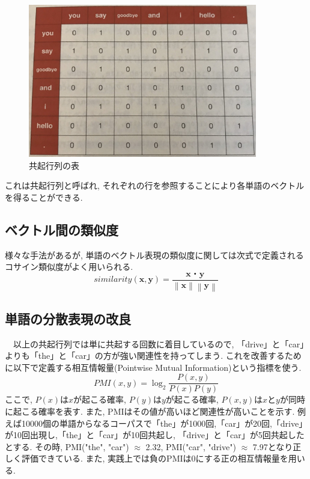 \documentclass[twocolumn]{jarticle}
\begin{document}
\begin{figure}[!htbp]
 \begin{center}
   \includegraphics[width=10cm]{./matrix.jpg}
   \caption{共起行列の表}
   \label{fig:}
 \end{center}
\end{figure}

これは共起行列と呼ばれ, それぞれの行を参照することにより各単語のベクトルを得ることができる.

\subsection{ベクトル間の類似度}
様々な手法があるが, 単語のベクトル表現の類似度に関しては次式で定義されるコサイン類似度がよく用いられる.
\begin{equation}
  similarity({\bm {x}}, {\bm {y}}) = \frac{{\bm {x}}・{\bm {y}}}{\left\lVert {\bm x} \right\rVert  \left\lVert {\bm y} \right\rVert}
\end{equation}

\subsection{単語の分散表現の改良}
　以上の共起行列では単に共起する回数に着目しているので, 「drive」と「car」よりも「the」と「car」の方が強い関連性を持ってしまう. これを改善するために以下で定義する相互情報量(Pointwise Mutual Information)という指標を使う.
\begin{equation}
  PMI(x, y) = \log_{2} \frac{P(x, y)}{P(x)P(y)}
\end{equation}
ここで, ${P(x)}$は${x}$が起こる確率, ${P(y)}$は${y}$が起こる確率, ${P(x, y)}$は${x}$と${y}$が同時に起こる確率を表す. また, PMIはその値が高いほど関連性が高いことを示す. 例えば10000個の単語からなるコーパスで「the」が1000回,「car」が20回,「drive」が10回出現し,「the」と「car」が10回共起し, 「drive」と「car」が5回共起したとする. その時, PMI("the", "car") ${\approx}$  2.32, PMI("car", "drive") ${\approx}$ 7.97となり正しく評価できている. また, 実践上では負のPMIは0にする正の相互情報量を用いる.
\end{document}
